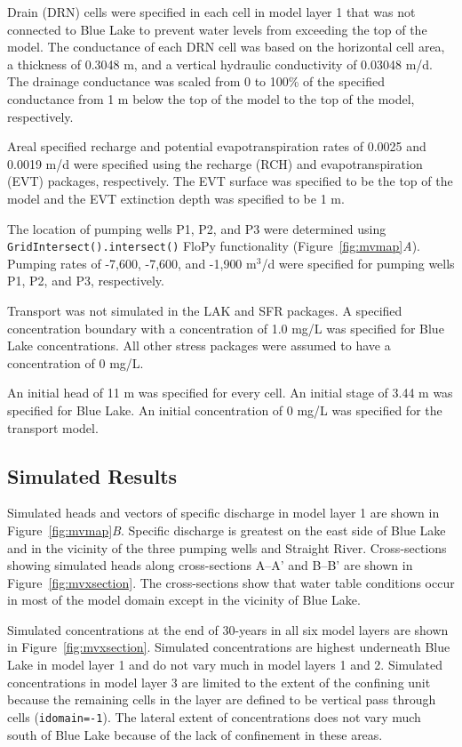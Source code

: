 \documentclass[11pt, oneside]{article}  	%
\begin{document}
Drain (DRN) cells were specified in each cell in model layer 1 that was not connected to Blue Lake to prevent water levels from exceeding the top of the model. The conductance of each DRN cell was based on the horizontal cell area, a thickness of 0.3048 m, and a vertical hydraulic conductivity of 0.03048 m/d. The drainage conductance was scaled from 0 to 100\% of the specified conductance from 1 m below the top of the model to the top of the model, respectively.

Areal specified recharge and potential evapotranspiration rates of 0.0025 and 0.0019 m/d were specified using the recharge (RCH) and evapotranspiration (EVT) packages, respectively. The EVT surface was specified to be the top of the model and the EVT extinction depth was specified to be 1 m.

The location of pumping wells P1, P2, and P3 were determined using \texttt{GridIntersect().intersect()} FloPy functionality (Figure~\ref{fig:mvmap}\textit{A}). Pumping rates of -7,600, -7,600, and -1,900 m$^3$/d were specified for pumping wells P1, P2, and P3, respectively.

Transport was not simulated in the LAK and SFR packages. A specified concentration boundary with a concentration of 1.0 mg/L was specified for Blue Lake concentrations. All other stress packages were assumed to have a concentration of 0 mg/L.

An initial head of 11 m was specified for every cell. An initial stage of 3.44 m was specified for Blue Lake. An initial concentration of 0 mg/L was specified for the transport model.

\subsection{Simulated Results}

Simulated heads and vectors of specific discharge in model layer 1 are shown in Figure~\ref{fig:mvmap}\textit{B}.  Specific discharge is greatest on the east side of Blue Lake and in the vicinity of the three pumping wells and Straight River. Cross-sections showing simulated heads along cross-sections A--A' and B--B' are shown in Figure~\ref{fig:mvxsection}. The cross-sections show that water table conditions occur in most of the model domain except in the vicinity of Blue Lake.

Simulated concentrations at the end of 30-years in all six model layers are shown in Figure~\ref{fig:mvxsection}. Simulated concentrations are highest underneath Blue Lake in model layer 1 and do not vary much in model layers 1 and 2. Simulated concentrations in model layer 3 are limited to the extent of the confining unit because the remaining cells in the layer are defined to be vertical pass through cells (\texttt{idomain=-1}). The lateral extent of concentrations does not vary much south of Blue Lake because of the lack of confinement in these areas.
\end{document}
